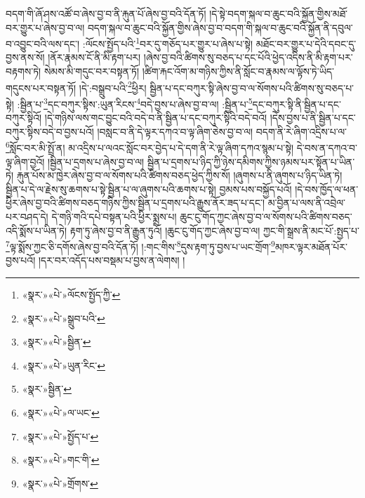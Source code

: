 བདག་གི་ཞོ་ཤས་འཚོ་བ་ཞེས་བྱ་བ་ནི་རྐུན་པོ་ཞེས་བྱ་བའི་དོན་ཏོ། །དེ་སྟེ་བདག་སྐལ་བ་ཆུང་བའི་སྐྱོན་གྱིས་མཐོ་བར་གྱུར་པ་ཞེས་བྱ་བ་ལ། བདག་སྐལ་བ་ཆུང་བའི་སྐྱོན་གྱིས་ཞེས་བྱ་བ་བདག་གི་སྐལ་བ་ཆུང་བའི་སྐྱོན་ནི་དབུལ་བ་འབྱུང་བའི་ལས་དང་། :ལོངས་སྤྱོད་པའི་\footnote{«སྣར་»«པེ་»ལོངས་སྤྱོད་ཀྱི་}བར་དུ་གཅོད་པར་གྱུར་པ་ཞེས་པ་སྟེ། མཐོང་བར་གྱུར་པ་དེའི་དབང་དུ་བྱས་ནས་སོ། །ནོར་རྣམས་ངོ་ནི་མི་རྟག་པར། །ཞེས་བྱ་བའི་ཚིགས་སུ་བཅད་པ་དང་པོའི་ཕྱེད་འདིས་ནི་མི་རྟག་པར་བརྟགས་ཏེ། སེམས་མི་གདུང་བར་བསྟན་ཏོ། །ཚིག་རྐང་འོག་མ་གཉིས་ཀྱིས་ནི་སློང་བ་རྣམས་ལ་ལྟོས་ཏེ་ཡིད་གདུངས་པར་བསྟན་ཏོ། །དེ་:བསྒྲུབ་པའི་\footnote{«སྣར་»«པེ་»སྒྲུབ་པའི་}ཕྱིར། སྦྱིན་པ་དང་བཀུར་སྟི་ཞེས་བྱ་བ་ལ་སོགས་པའི་ཚིགས་སུ་བཅད་པ་སྟེ། :སྦྱིན་པ་\footnote{«སྣར་»«པེ་»སྦྱིན་}དང་བཀུར་སྟིས་:ཡུན་རིངས་\footnote{«སྣར་»«པེ་»ཡུན་རིང་}བདེ་བྱས་པ་ཞེས་བྱ་བ་ལ། :སྦྱིན་པ་\footnote{«སྣར་»སྦྱིན་}དང་བཀུར་སྟི་ནི་སྦྱིན་པ་དང་བཀུར་སྟིའོ། །དེ་གཉིས་ལས་གང་བྱུང་བའི་བདེ་བ་ནི་སྦྱིན་པ་དང་བཀུར་སྟིའི་བདེ་བའོ། །དེས་བྱས་པ་ནི་སྦྱིན་པ་དང་བཀུར་སྟིས་བདེ་བ་བྱས་པའོ། །བསླང་བ་ནི་དེ་ལྟར་དཀའ་བ་ལྟ་ཞིག་ཅེས་བྱ་བ་ལ། བདག་ནི་རེ་ཞིག་འདྲིས་པ་ལ་\footnote{«སྣར་»«པེ་»ལ་ཡང་}སློང་བར་མི་སྤྲོ་ན། མ་འདྲིས་པ་ལའང་སློང་བར་བྱེད་པ་དེ་དག་ནི་རེ་ལྟ་ཞིག་དཀའ་སྙམ་པ་སྟེ། དེ་བས་ན་དཀའ་བ་ལྟ་ཞིག་བྱའོ། །སྦྱིན་པ་དྲགས་པ་ཞེས་བྱ་བ་ལ། སྦྱིན་པ་དྲགས་པ་ཉིད་ཀྱི་ཉེས་དམིགས་ཀྱིས་ཉམས་པར་སྟོན་པ་ཡིན་ཏེ། རྐུན་པོས་མ་ཁྱེར་ཞེས་བྱ་བ་ལ་སོགས་པའི་ཚིགས་བཅད་ཕྱེད་ཀྱིས་སོ། །ཞུགས་པ་ནི་ཞུགས་པ་ཉིད་ཡིན་ཏེ། སྦྱིན་པ་དེ་ལ་རྗེས་སུ་ཆགས་པ་སྟེ་སྦྱིན་པ་ལ་ཞུགས་པའི་ཆགས་པ་སྟེ། བྱམས་པས་བསྐྱོད་པའོ། །དེ་བས་ཁྱོད་ལ་ཕན་ཕྱིར་ཞེས་བྱ་བའི་ཚིགས་བཅད་གཉིས་ཀྱིས་སྦྱིན་པ་དྲགས་པའི་རྒྱུས་ནོར་ཟད་པ་དང་། མ་བྱིན་པ་ལས་ནི་འབྲེལ་པར་བཤད་དེ། དེ་གཉི་གའི་དཔེ་བསྟན་པའི་ཕྱིར་སྨྲས་པ། ཆུང་ངུ་གོད་ཀྱང་ཞེས་བྱ་བ་ལ་སོགས་པའི་ཚིགས་བཅད་འདི་སྨོས་པ་ཡིན་ཏེ། རྟག་ཏུ་ཞེས་བྱ་བ་ནི་རྒྱུན་ཏུའོ། །ཆུང་ངུ་གོད་ཀྱང་ཞེས་བྱ་བ་ལ། ཀྱང་གི་སྒྲས་ནི་མང་པོ་:སྤྱད་པ་\footnote{«སྣར་»«པེ་»སྤྱོད་པ་}ལྟ་སྨོས་ཀྱང་ཅི་དགོས་ཞེས་བྱ་བའི་དོན་ཏོ། །:གང་གིས་\footnote{«སྣར་»«པེ་»གང་གི་}དུས་རྟག་ཏུ་བྱས་པ་ཡང་གྲོག་\footnote{«སྣར་»«པེ་»གྲོགས་}མཁར་ལྟར་མཐོན་པོར་བྱས་པའོ། །དར་བར་འདོད་པས་བསྡམ་པ་བྱས་ན་ལེགས། །

